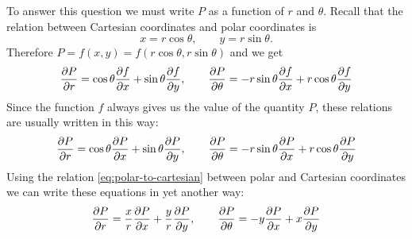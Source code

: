 To answer this question we must write $P$ as a function of $r$ and $\theta$.
Recall that the relation between Cartesian coordinates and polar coordinates is
\begin{equation}\label{eq:polar-to-cartesian}
  x = r\cos \theta, \qquad y= r\sin \theta.
\end{equation}
Therefore $P=f(x, y) = f(r\cos \theta, r\sin \theta)$ and we get
\begin{equation}
  \frac{\partial P}{\partial r} = \cos \theta \frac{\partial f}{\partial x} + \sin \theta \frac{\partial f}{\partial y},
  \qquad
  \frac{\partial P}{\partial \theta} = 
  -r\sin \theta\frac{\partial f}{\partial x} + r\cos \theta \frac{\partial f}{\partial y}
\end{equation}
Since the function $f$ always gives us the value of the quantity $P$, these
relations are usually written in this way:
\begin{equation}
  \frac{\partial P}{\partial r} = \cos \theta \frac{\partial P}{\partial x} + \sin \theta \frac{\partial P}{\partial y},
  \qquad
  \frac{\partial P}{\partial \theta} = 
  -r\sin \theta\frac{\partial P}{\partial x} + r\cos \theta \frac{\partial P}{\partial y}
\end{equation}
Using the relation \eqref{eq:polar-to-cartesian} between polar and Cartesian
coordinates we can write these equations in yet another way:
\begin{equation}
  \frac{\partial P}{\partial r} = \frac xr \frac{\partial P}{\partial x} + \frac yr \frac{\partial P}{\partial y},
  \qquad
  \frac{\partial P}{\partial \theta} = -y \frac{\partial P}{\partial x} + x \frac{\partial P}{\partial y}
\end{equation}

 

